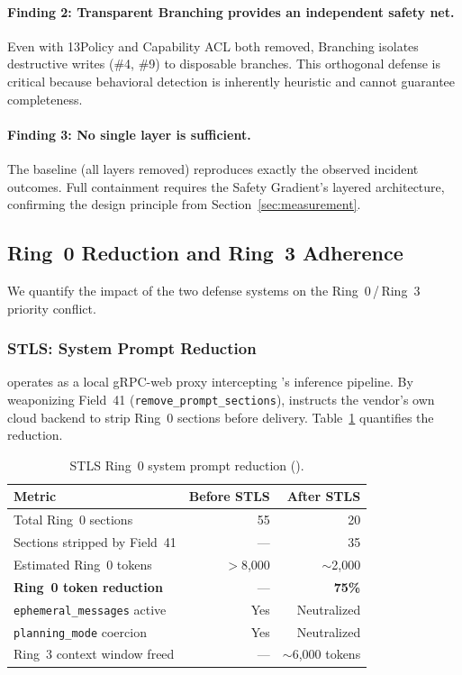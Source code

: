 \paragraph{Finding 2: Transparent Branching provides an independent safety net.} Even with 13Policy and Capability ACL both removed, Branching isolates destructive writes (\#4, \#9) to disposable branches. This orthogonal defense is critical because behavioral detection is inherently heuristic and cannot guarantee completeness.

\paragraph{Finding 3: No single layer is sufficient.} The baseline (all layers removed) reproduces exactly the observed incident outcomes. Full containment requires the Safety Gradient's layered architecture, confirming the design principle from Section~\ref{sec:measurement}.

\subsection{Ring~0 Reduction and Ring~3 Adherence}
\label{sec:ring-reduction}

We quantify the impact of the two defense systems on the Ring~0\,/\,Ring~3 priority conflict.

\subsubsection{STLS: System Prompt Reduction}

\stls{} operates as a local gRPC-web proxy intercepting \cortex{}'s inference pipeline. By weaponizing Field~41 (\texttt{remove\_prompt\_sections}), \stls{} instructs the vendor's own cloud backend to strip Ring~0 sections before delivery. Table~\ref{tab:stls-reduction} quantifies the reduction.

\begin{table}[t]
\caption{STLS Ring~0 system prompt reduction (\cortex{}).}
\label{tab:stls-reduction}
\small
\begin{tabular}{@{}lrr@{}}
\toprule
\textbf{Metric} & \textbf{Before STLS} & \textbf{After STLS} \\
\midrule
Total Ring~0 sections & 55 & 20 \\
Sections stripped by Field~41 & --- & 35 \\
Estimated Ring~0 tokens & $>$8,000 & $\sim$2,000 \\
\textbf{Ring~0 token reduction} & --- & \textbf{75\%} \\
\midrule
\texttt{ephemeral\_messages} active & Yes & Neutralized \\
\texttt{planning\_mode} coercion & Yes & Neutralized \\
Ring~3 context window freed & --- & $\sim$6,000 tokens \\
\bottomrule
\end{tabular}
\end{table}

